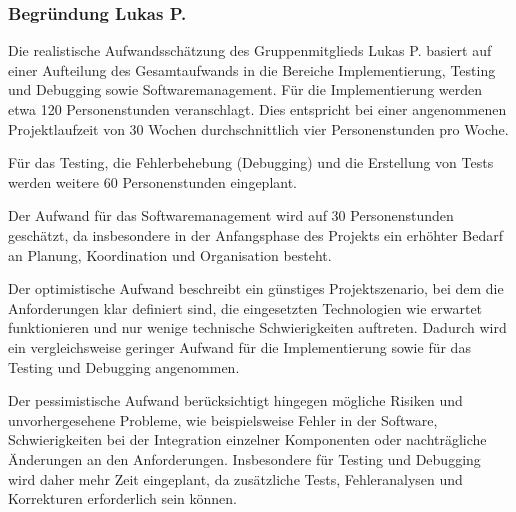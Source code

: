 \documentclass[a4paper,10pt]{article}
\begin{document}
\subsubsection*{Begründung Lukas P.}
        Die realistische Aufwandsschätzung des Gruppenmitglieds Lukas P. basiert auf einer Aufteilung des Gesamtaufwands in die Bereiche Implementierung, Testing und Debugging sowie Softwaremanagement.
        Für die Implementierung werden etwa 120 Personenstunden veranschlagt.
        Dies entspricht bei einer angenommenen Projektlaufzeit von 30 Wochen durchschnittlich vier Personenstunden pro Woche.\par
        Für das Testing, die Fehlerbehebung (Debugging) und die Erstellung von Tests werden weitere 60 Personenstunden eingeplant.\par
        Der Aufwand für das Softwaremanagement wird auf 30 Personenstunden geschätzt, da insbesondere in der Anfangsphase des Projekts ein erhöhter Bedarf an Planung, Koordination und Organisation besteht.\par
        Der optimistische Aufwand beschreibt ein günstiges Projektszenario, bei dem die Anforderungen klar definiert sind, die eingesetzten Technologien wie erwartet funktionieren und nur wenige technische Schwierigkeiten auftreten.
        Dadurch wird ein vergleichsweise geringer Aufwand für die Implementierung sowie für das Testing und Debugging angenommen. \par
        Der pessimistische Aufwand berücksichtigt hingegen mögliche Risiken und unvorhergesehene Probleme, wie beispielsweise Fehler in der Software, Schwierigkeiten bei der Integration einzelner Komponenten oder nachträgliche Änderungen an den Anforderungen.
        Insbesondere für Testing und Debugging wird daher mehr Zeit eingeplant, da zusätzliche Tests, Fehleranalysen und Korrekturen erforderlich sein können.\par
\end{document}
